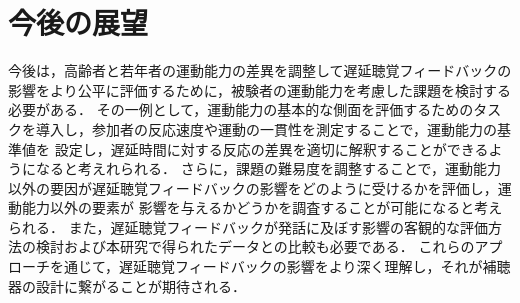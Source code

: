 \section{今後の展望}
今後は，高齢者と若年者の運動能力の差異を調整して遅延聴覚フィードバックの影響をより公平に評価するために，被験者の運動能力を考慮した課題を検討する必要がある．
その一例として，運動能力の基本的な側面を評価するためのタスクを導入し，参加者の反応速度や運動の一貫性を測定することで，運動能力の基準値を
設定し，遅延時間に対する反応の差異を適切に解釈することができるようになると考えれられる．
さらに，課題の難易度を調整することで，運動能力以外の要因が遅延聴覚フィードバックの影響をどのように受けるかを評価し，運動能力以外の要素が
影響を与えるかどうかを調査することが可能になると考えられる．
また，遅延聴覚フィードバックが発話に及ぼす影響の客観的な評価方法の検討および本研究で得られたデータとの比較も必要である．
これらのアプローチを通じて，遅延聴覚フィードバックの影響をより深く理解し，それが補聴器の設計に繋がることが期待される．